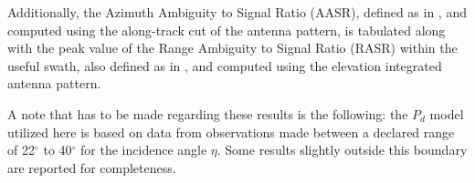 \documentclass[conference,a4paper]{IEEEtran}
\begin{document}
    Additionally, the Azimuth Ambiguity to Signal Ratio (AASR), defined as in \cite{curlander1991synthetic}, and computed using the along-track cut of the antenna pattern, is tabulated along with the peak value of the Range Ambiguity to Signal Ratio (RASR) within the useful swath, also defined as in \cite{curlander1991synthetic}, and computed using the elevation integrated antenna pattern.
    \begin{table}[t]
        \caption{Design examples results}
        \label{tab:analysis}
        \centering
        \large
    \end{table}
    A note that has to be made regarding these results is the following: the $P_d$ model utilized here is based on data from observations made between a declared range of 22$^\circ$ to 40$^\circ$ for the incidence angle $\eta$.
    Some results slightly outside this boundary are reported for completeness.
\end{document}
